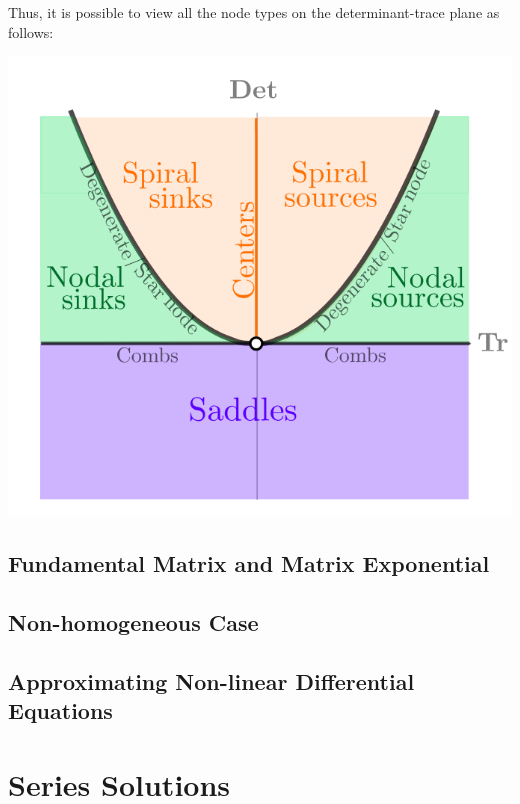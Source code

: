 \documentclass{report}
\begin{document}
Thus, it is possible to view all the node types on the determinant-trace plane as follows:

\includegraphics[scale=0.5]{trace_det_full.png}



























\section{Fundamental Matrix and Matrix Exponential}
\section{Non-homogeneous Case}
\section{Approximating Non-linear Differential Equations}


\chapter{Series Solutions}
\end{document}
